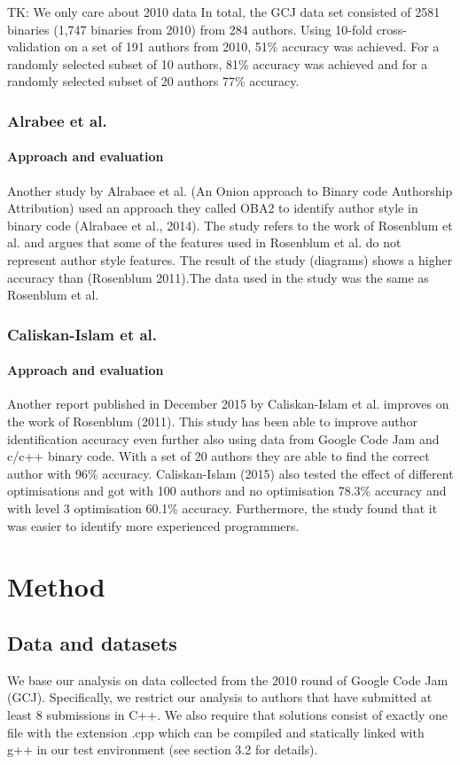 \documentclass[a4paper,11pt]{kth-mag}
\begin{document}
TK: We only care about 2010 data
In total, the GCJ data set consisted of 2581 binaries (1,747 binaries from
2010) from 284 authors. Using 10-fold cross-validation on a set of 191 authors
from 2010, 51\% accuracy was achieved. For a randomly selected subset of 10
authors, 81\% accuracy was achieved and for a randomly selected subset of 20
authors 77\% accuracy.

\subsection{Alrabee et al.}
\subsubsection{Approach and evaluation}
Another study by Alrabaee et al. (An Onion approach to Binary code Authorship
Attribution) used an approach they called OBA2 to identify author style in
binary code (Alrabaee et al., 2014). The study refers to the work of Rosenblum
et al. and argues that some of the features used in Rosenblum et al. do not
represent author style features. The result of the study (diagrams) shows a
higher accuracy than (Rosenblum 2011).The data used in the study was the same
as Rosenblum et al. 

\subsection{Caliskan-Islam et al.}
\subsubsection{Approach and evaluation}
Another report published in December 2015 by Caliskan-Islam et al. improves on
the work of Rosenblum (2011). This study has been able to improve author
identification accuracy even further also using data from Google Code Jam and
c/c++ binary code. With a set of 20 authors they are able to find the correct
author with 96\% accuracy. Caliskan-Islam (2015) also tested the effect of
different optimisations and got with 100 authors and no optimisation 78.3\%
accuracy and with level 3 optimisation 60.1\% accuracy. Furthermore, the study
found that it was easier to identify more experienced programmers.

\chapter{Method}
\section{Data and datasets}
We base our analysis on data collected from the 2010 round of Google Code Jam
(GCJ). Specifically, we restrict our analysis to authors that have submitted at
least 8 submissions in C++. We also require that solutions consist of exactly
one file with the extension .cpp which can be compiled and statically linked
with g++ in our test environment (see section 3.2 for details).
\end{document}
